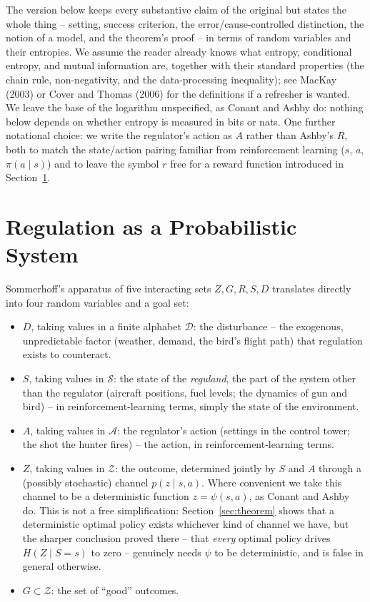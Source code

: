 \documentclass[11pt]{article}
\theoremstyle{definition}
\theoremstyle{remark}
\newcommand{\Dcal}{\mathcal{D}}
\newcommand{\Scal}{\mathcal{S}}
\newcommand{\Acal}{\mathcal{A}}
\newcommand{\Zcal}{\mathcal{Z}}
\begin{document}
The version below keeps every substantive claim of the original but states
the whole thing -- setting, success criterion, the error/cause-controlled
distinction, the notion of a model, and the theorem's proof -- in terms of
random variables and their entropies. We assume the reader already knows
what entropy, conditional entropy, and mutual information are, together
with their standard properties (the chain rule, non-negativity, and the
data-processing inequality); see MacKay (2003) or Cover and Thomas (2006)
for the definitions if a refresher is wanted. We leave the base of the
logarithm unspecified, as Conant and Ashby do: nothing below depends on
whether entropy is measured in bits or nats. One further notational
choice: we write the regulator's action as $A$ rather than Ashby's $R$,
both to match the state/action pairing familiar from reinforcement
learning ($s$, $a$, $\pi(a\mid s)$) and to leave the symbol $r$ free for a
reward function introduced in Section~\ref{sec:setup}.

\section{Regulation as a Probabilistic System}
\label{sec:setup}

Sommerhoff's apparatus of five interacting sets $Z, G, R, S, D$ translates
directly into four random variables and a goal set:

\begin{itemize}
\item $D$, taking values in a finite alphabet $\Dcal$: the disturbance --
  the exogenous, unpredictable factor (weather, demand, the bird's flight
  path) that regulation exists to counteract.
\item $S$, taking values in $\Scal$: the state of the \emph{reguland}, the
  part of the system other than the regulator (aircraft positions, fuel
  levels; the dynamics of gun and bird) -- in reinforcement-learning terms,
  simply the state of the environment.
\item $A$, taking values in $\Acal$: the regulator's action (settings in
  the control tower; the shot the hunter fires) -- the action, in
  reinforcement-learning terms.
\item $Z$, taking values in $\Zcal$: the outcome, determined jointly by $S$
  and $A$ through a (possibly stochastic) channel $p(z\mid s,a)$. Where
  convenient we take this channel to be a deterministic function
  $z=\psi(s,a)$, as Conant and Ashby do. This is not a free simplification:
  Section~\ref{sec:theorem} shows that a deterministic optimal policy
  exists whichever kind of channel we have, but the sharper conclusion
  proved there -- that \emph{every} optimal policy drives $H(Z\mid S=s)$
  to zero -- genuinely needs $\psi$ to be deterministic, and is false in
  general otherwise.
\item $G\subset\Zcal$: the set of ``good'' outcomes.
\end{itemize}
\end{document}
